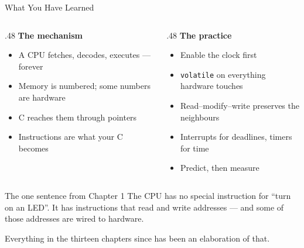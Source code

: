 \documentclass[9pt,aspectratio=169,xcolor=table]{beamer}
\begin{document}
\begin{frame}{What You Have Learned}
    \begin{columns}[T]
    \begin{column}{.48\textwidth}
        \textbf{The mechanism}
        {\small
        \begin{itemize}\itemsep1pt
            \item A CPU fetches, decodes, executes --- forever
            \item Memory is numbered; some numbers are hardware
            \item C reaches them through \alert{pointers}
            \item Instructions are what your C becomes
        \end{itemize}}
    \end{column}
    \begin{column}{.48\textwidth}
        \textbf{The practice}
        {\small
        \begin{itemize}\itemsep1pt
            \item Enable the clock first
            \item \texttt{volatile} on everything hardware touches
            \item Read--modify--write preserves the neighbours
            \item Interrupts for deadlines, timers for time
            \item \alert{Predict, then measure}
        \end{itemize}}
    \end{column}
    \end{columns}

    \vspace{3mm}
    \begin{block}{The one sentence from Chapter 1}
        \alert{The CPU has no special instruction for ``turn on an LED''.} It has
        instructions that read and write addresses --- and some of those addresses
        are wired to hardware.

        \vspace{1mm}
        Everything in the thirteen chapters since has been an elaboration of that.
    \end{block}
\end{frame}
\end{document}

